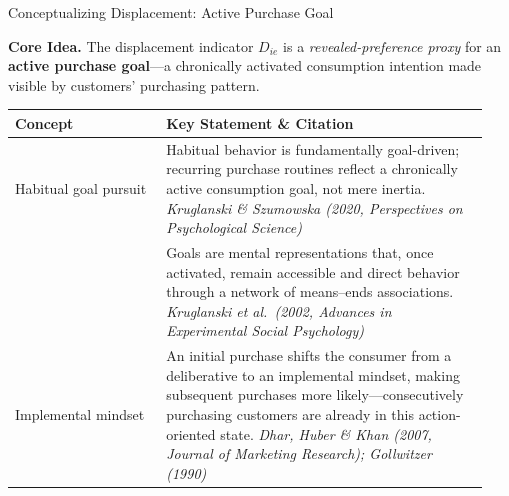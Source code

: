 \documentclass[aspectratio=169]{beamer}  %
\begin{document}
\begin{frame}{Conceptualizing Displacement: Active Purchase Goal}
\footnotesize

\textbf{Core Idea.}
The displacement indicator $D_{ie}$ is a \emph{revealed-preference proxy} for an
\textbf{active purchase goal}---a chronically activated consumption intention
made visible by customers' purchasing pattern.

\vspace{0.5cm}

\medskip
\tiny
\begin{tabular}{@{} p{0.30\linewidth} p{0.64\linewidth} @{}}
\toprule
\textbf{Concept} & \textbf{Key Statement \& Citation} \\
\midrule
Habitual goal pursuit &
Habitual behavior is fundamentally goal-driven; recurring
purchase routines reflect a chronically active consumption goal,
not mere inertia.
\newline
\textit{Kruglanski \& Szumowska (2020, Perspectives on Psychological Science)} \\
\addlinespace[4pt]
 &
Goals are mental representations that, once activated,
remain accessible and direct behavior through a network
of means--ends associations.
\newline
\textit{Kruglanski et al.\ (2002, Advances in Experimental Social Psychology)} \\
\addlinespace[4pt]
Implemental mindset &
An initial purchase shifts the consumer from a deliberative
to an implemental mindset, making subsequent purchases more
likely---consecutively purchasing customers are already in
this action-oriented state.
\newline
\textit{Dhar, Huber \& Khan (2007, Journal of Marketing Research);
Gollwitzer (1990)} \\
\bottomrule
\end{tabular}
\end{frame}
\end{document}
